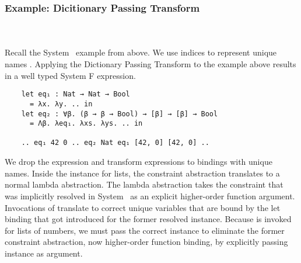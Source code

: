 \subsubsection{Example: Dicitionary Passing Transform}\hfill\\\\
Recall the System \Fo\ example from above. 
We use indices to represent unique names .
Applying the Dictionary Passing Transform to the example above results in a well typed System F expression.
\begin{verbatim}
    let eq₁ : Nat → Nat → Bool 
      = λx. λy. .. in
    let eq₂ : ∀β. (β → β → Bool) → [β] → [β] → Bool 
      = Λβ. λeq₁. λxs. λys. .. in
    
    .. eq₁ 42 0 .. eq₂ Nat eq₁ [42, 0] [42, 0] .. 
\end{verbatim}
We drop the \inl{|\Decl|}expression and transform \inl{|\Inst|}expressions to  bindings with unique names. 
Inside the instance for lists, the constraint abstraction translates to a normal lambda abstraction. 
The lambda abstraction takes the constraint that was implicitly resolved in System \Fo\ as an explicit higher-order function argument.
Invocations of  translate to correct unique variables  that are bound by the let binding that got introduced for the former resolved instance.
Because  is invoked for lists of numbers, we must pass the correct instance to eliminate the former constraint abstraction, now higher-order function binding, by explicitly passing instance  as argument.
